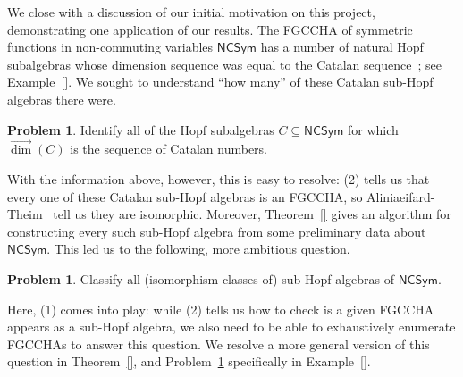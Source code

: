 \documentclass[11pt]{amsart}
\theoremstyle{definition}
\newtheorem{problem}[theorem]{Problem}
\numberwithin{equation}{section}
\newcommand{\FGCCHA}{\textsf{FGCCHA}\xspace}
\newcommand{\FGCCHAs}{\textsf{FGCCHA}s\xspace}
\newcommand{\vecdim}{\overrightarrow{\dim}}
\begin{document}
We close with a discussion of our initial motivation on this project, demonstrating one application of our results.  
The \FGCCHA of symmetric functions in non-commuting variables $\mathsf{NCSym}$ has a number of natural Hopf subalgebras whose dimension sequence was equal to the Catalan sequence~\cite[A000108]{OEIS}; see Example~\ref{}.  
We sought to understand ``how many'' of these Catalan sub-Hopf algebras there were.  

\begin{problem}
\label{prob1}
Identify all of the Hopf subalgebras $C \subseteq \mathsf{NCSym}$ for which $\vecdim(C)$ is the sequence of Catalan numbers.
\end{problem}

With the information above, however, this is easy to resolve: (2) tells us that every one of these Catalan sub-Hopf algebras is an \FGCCHA, so Aliniaeifard-Theim~\cite{AT20} tell us they are isomorphic.  Moreover, Theorem~\ref{} gives an algorithm for constructing every such sub-Hopf algebra from some preliminary data about $\mathsf{NCSym}$.  This led us to the following, more ambitious question.

\begin{problem}
\label{prob2}
Classify all (isomorphism classes of) sub-Hopf algebras of $\mathsf{NCSym}$.
\end{problem}

Here, (1) comes into play: while (2) tells us how to check is a given \FGCCHA appears as a sub-Hopf algebra, we also need to be able to exhaustively enumerate \FGCCHAs to answer this question.  
We resolve a more general version of this question in Theorem~\ref{}, and Problem~\ref{prob2} specifically in Example~\ref{}.  

%
%
%
%
%
\end{document}
